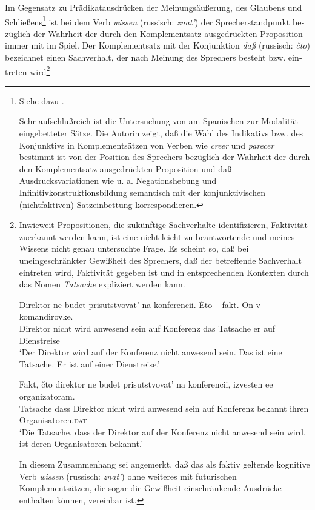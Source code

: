 \documentclass[output=paper]{langscibook}
\begin{document}
\begin{otherlanguage}{german}
\largerpage
Im Gegensatz zu Prädikatausdrücken der Meinungsäußerung, des Glaubens und Schließens\footnote{Siehe dazu \citet{Zimmermann82Explizite-und}. 

\noindent Sehr aufschlußreich ist die Untersuchung von \citet{rivero1971mood-and-presupposition-in-spanish} am Spanischen zur Modalität eingebetteter Sätze. Die Autorin zeigt, daß die Wahl des Indikativs bzw. des Konjunktivs in Komplementsätzen von Verben wie \textit{creer} und \textit{parecer} bestimmt ist von der Position des Sprechers bezüglich der Wahrheit der durch den Komplementsatz ausgedrückten Proposition und daß Ausdrucksvariationen wie u. a. Negationshebung und Infinitivkonstruktionsbildung semantisch mit der konjunktivischen (nichtfaktiven) Satzeinbettung korrespondieren.} ist bei dem Verb \textit{wissen} (russisch: \textit{znat’}) der Sprecherstandpunkt bezüglich der Wahrheit der durch den Komplementsatz ausgedrückten Proposition immer mit im Spiel. Der Komplementsatz mit der Konjunktion \textit{daß} (russisch: \textit{čto}) bezeichnet einen Sachverhalt, der nach Meinung des Sprechers besteht bzw. eintreten wird\footnote{Inwieweit Propositionen, die zukünftige Sachverhalte identifizieren, Faktivität zuerkannt werden kann, ist eine nicht leicht zu beantwortende und meines Wissens nicht genau untersuchte Frage. Es scheint so, daß bei uneingeschränkter Gewißheit des Sprechers, daß der betreffende Sachverhalt eintreten wird, Faktivität gegeben ist und in entsprechenden Kontexten durch das Nomen \textit{Tatsache} expliziert werden kann.

\ea \label{ex:zi83:f53i} 
    \gll Direktor ne budet prisutstvovat’ na konferencii. Ėto -- fakt. On v komandirovke.\\
    Direktor nicht wird {anwesend sein} auf  Konferenz das {}  Tatsache er  auf  Dienstreise \\
    \glt ‘Der Direktor wird auf der Konferenz nicht anwesend sein. Das ist eine Tatsache. Er ist auf einer Dienstreise.’
    
\ex \label{ex:zi83:f53ii}
    \gll Fakt, čto direktor ne budet prisutstvovat’ na konferencii, izvesten ee organizatoram. \\
     Tatsache dass Direktor nicht wird {anwesend sein} auf  Konferenz bekannt ihren Organisatoren.\textsc{dat} \\
    \glt ‘Die Tatsache, dass der Direktor auf der Konferenz nicht anwesend sein wird, ist deren Organisatoren bekannt.’
\z

\noindent In diesem Zusammenhang sei angemerkt, daß das als faktiv geltende kognitive Verb \textit{wissen} (russisch: \textit{znat’}) ohne weiteres mit futurischen Komplementsätzen, die sogar die Gewißheit einschränkende Ausdrücke enthalten können, vereinbar ist.

}
\end{otherlanguage}
\end{document}
